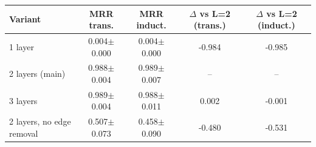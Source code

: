 \begin{tabular}{lcccc}\toprule
Variant & MRR trans. & MRR induct. & $\Delta$ vs L=2 (trans.) & $\Delta$ vs L=2 (induct.) \\\midrule
1 layer & 0.004$\pm$0.000 & 0.004$\pm$0.000 & -0.984 & -0.985 \\
2 layers (main) & 0.988$\pm$0.004 & 0.989$\pm$0.007 & -- & -- \\
3 layers & 0.989$\pm$0.004 & 0.988$\pm$0.011 & 0.002 & -0.001 \\
2 layers, no edge removal & 0.507$\pm$0.073 & 0.458$\pm$0.090 & -0.480 & -0.531 \\
\bottomrule\end{tabular}
